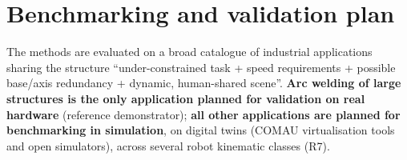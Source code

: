 \documentclass{plan4ari_report}
\begin{document}
\section{Benchmarking and validation plan}\label{sec:bench}

\begin{planbox}
The methods are evaluated on a broad catalogue of industrial applications sharing the structure ``under-constrained task + speed requirements + possible base/axis redundancy + dynamic, human-shared scene''. \textbf{Arc welding of large structures is the only application planned for validation on real hardware} (reference demonstrator); \textbf{all other applications are planned for benchmarking in simulation}, on digital twins (COMAU virtualisation tools and open simulators), across several robot kinematic classes (R7).
\end{planbox}
\end{document}
